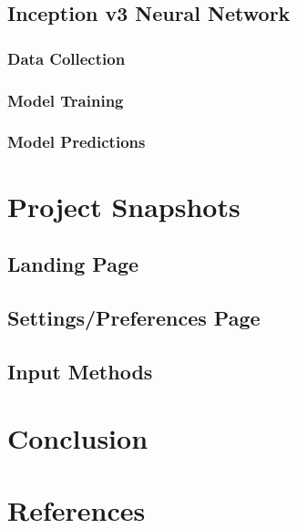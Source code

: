\documentclass[14pt]{report}
\begin{document}
		\section{Inception v3 Neural Network}
			\subsection{Data Collection}
			\subsection{Model Training}
			\subsection{Model Predictions}


	\newpage


	\chapter{Project Snapshots}\label{chapter5}
		
	

		\section{Landing Page}
		\section{Settings/Preferences Page}
		\section{Input Methods}

	\newpage


	\chapter{Conclusion}\label{chapter6}
		
	

	\newpage


	\chapter*{References}\label{chapter7}
		
	

	\newpage
\end{document}
